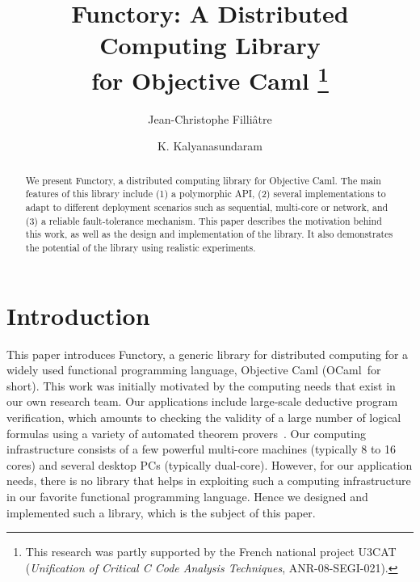 \documentclass{llncs}
\newcommand{\Ocaml}{OCaml}
\newcommand{\functory}{\textsf{Functory}}
\begin{document}
\title{Functory: A Distributed Computing Library \\ for Objective Caml 
\thanks{This
    research was partly supported by the French national project U3CAT
    (\emph{Unification of Critical C Code Analysis Techniques},
    ANR-08-SEGI-021).}}

\author{Jean-Christophe Filli\^{a}tre \and K. Kalyanasundaram}


\maketitle

\begin{abstract}
  We present Functory, a distributed computing library for
  Objective Caml. The main features of this library
  include (1) a polymorphic API, (2) several implementations to
  adapt to different deployment scenarios such as sequential,
  multi-core or network, and (3) a reliable fault-tolerance mechanism.
  This paper describes the motivation behind this work, as well as
  the design and implementation of the library. It also demonstrates
  the potential of the library using realistic experiments.
\end{abstract}


\section{Introduction}


This paper introduces \functory, a generic library for distributed
computing for a widely used functional programming language,
Objective Caml (\Ocaml\ for short). 
This work was initially motivated by the computing needs that
exist in our own research team. Our applications include large-scale
deductive program verification, which amounts to checking the validity
of a large number of logical formulas using a variety of automated
theorem provers~\cite{filliatre07cav}. Our computing infrastructure
consists of a few powerful multi-core machines (typically 8 to 16
cores) and several desktop PCs (typically dual-core). However, for our
application needs, there is no library that helps in exploiting such a
computing infrastructure in our favorite functional programming
language.  Hence we designed and implemented such a library, which is
the subject of this paper.  
\end{document}

